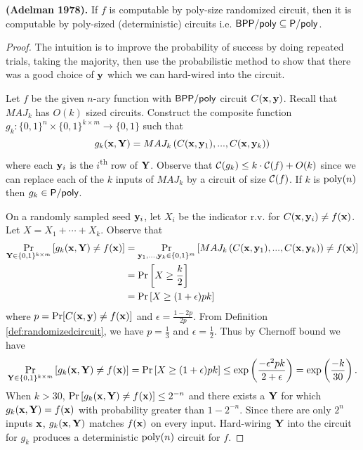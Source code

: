 \documentclass[11pt]{article}
\begin{document}
	\begin{theorem}
		\textbf{(Adelman 1978).} If $f$ is computable by poly-size randomized circuit, then it is computable by poly-sized (deterministic) circuits i.e. $\mathsf{BPP/poly} \subseteq \mathsf{P/poly}$.
	\end{theorem}
	\begin{proof}
		The intuition is to improve the probability of success by doing repeated trials, taking the majority, then use the probabilistic method to show that there was a good choice of $\mathbf{y}$ which we can hard-wired into the circuit.
		
		Let $f$ be the given $n$-ary function with $\mathsf{BPP/poly}$ circuit $C(\mathbf{x}, \mathbf{y})$. Recall that $MAJ_k$ has $O(k)$ sized circuits. Construct the composite function $g_k: \{0, 1\}^{n} \times \{0,1\}^{k \times m} \rightarrow \{0,1\}$ such that 
		\[g_k(\mathbf{x}, \mathbf{Y}) = MAJ_k\left(C(\mathbf{x}, \mathbf{y}_1), ..., C(\mathbf{x}, \mathbf{y}_k)\right)\] 
		where each $\mathbf{y}_i$ is the $i$\textsuperscript{th} row of $\mathbf{Y}$. Observe that $\mathcal{C}(g_k) \leq k \cdot \mathcal{C}(f) + O(k)$ since we can replace each of the $k$ inputs of $MAJ_k$ by a circuit of size $\mathcal{C}(f)$. If $k$ is $\operatorname*{poly}(n)$ then $g_k \in \mathsf{P/poly}$.
		
		On a randomly sampled seed $\mathbf{y}_i$, let $X_i$ be the indicator r.v. for $C(\mathbf{x}, \mathbf{y}_i) \neq f(\mathbf{x})$. Let $X = X_1 + \cdots + X_k$. Observe that 
		\begin{align*}
			\Pr_{\mathbf{Y} \in \{0,1\}^{k \times m}}\left[g_k(\mathbf{x}, \mathbf{Y}) \neq f(\mathbf{x})\right] &= \Pr_{\mathbf{y}_1, ..., \mathbf{y}_k \in \{0,1\}^{m}}\left[MAJ_k\left(C(\mathbf{x}, \mathbf{y}_1), ..., C(\mathbf{x}, \mathbf{y}_k)\right) \neq f(\mathbf{x})\right]\\
			&= \Pr\left[X \geq \frac{k}{2}\right]\\
			&= \Pr\left[X \geq (1 + \epsilon)pk\right]
		\end{align*}
		where $p = \Pr[C(\mathbf{x}, \mathbf{y}) \neq f(\mathbf{x})]$ and $\epsilon = \frac{1 - 2p}{2p}$. From Definition \ref{def:randomizedcircuit}, we have $p = \frac{1}{3}$ and $\epsilon = \frac{1}{2}$. Thus by Chernoff bound we have
		\[\Pr_{\mathbf{Y} \in \{0,1\}^{k \times m}}\left[g_k(\mathbf{x}, \mathbf{Y}) \neq f(\mathbf{x})\right] = \Pr\left[X \geq (1 + \epsilon)pk\right] \leq \exp\left(\frac{-\epsilon^2pk}{2 + \epsilon}\right) = \exp\left(\frac{-k}{30}\right).\]
		When $k > 30$, $\Pr\left[g_k(\mathbf{x}, \mathbf{Y}) \neq f(\mathbf{x})\right] \leq 2^{-n}$ and there exists a $\mathbf{Y}$ for which $g_k(\mathbf{x}, \mathbf{Y}) = f(\mathbf{x})$ with probability greater than $1 - 2^{-n}$. Since there are only $2^{n}$ inputs $\mathbf{x}$, $g_k(\mathbf{x}, \mathbf{Y})$ matches $f(\mathbf{x})$ on every input. Hard-wiring $\mathbf{Y}$ into the circuit for $g_k$ produces a deterministic $\operatorname*{poly}(n)$ circuit for $f$. 
	\end{proof}
	
\end{document}
